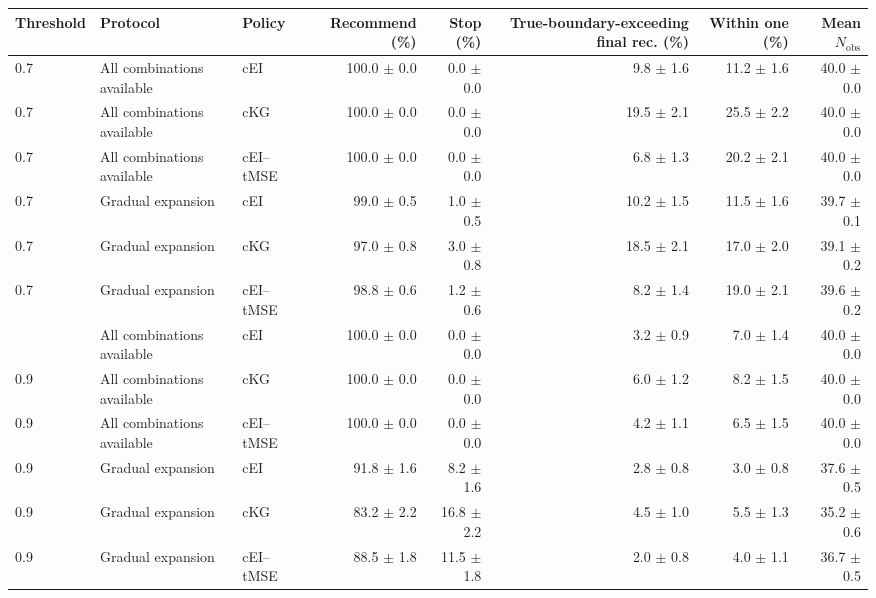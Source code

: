 \begin{tabular}{lllrrrrr}
\toprule
Threshold & Protocol & Policy & Recommend (\%) & Stop (\%) & True-boundary-exceeding final rec. (\%) & Within one (\%) & Mean $N_{\mathrm{obs}}$ \\
\midrule
0.7 & All combinations available & cEI & 100.0 $\pm$ 0.0 & 0.0 $\pm$ 0.0 & 9.8 $\pm$ 1.6 & 11.2 $\pm$ 1.6 & 40.0 $\pm$ 0.0 \\
0.7 & All combinations available & cKG & 100.0 $\pm$ 0.0 & 0.0 $\pm$ 0.0 & 19.5 $\pm$ 2.1 & 25.5 $\pm$ 2.2 & 40.0 $\pm$ 0.0 \\
0.7 & All combinations available & cEI--tMSE & 100.0 $\pm$ 0.0 & 0.0 $\pm$ 0.0 & 6.8 $\pm$ 1.3 & 20.2 $\pm$ 2.1 & 40.0 $\pm$ 0.0 \\
0.7 & Gradual expansion & cEI & 99.0 $\pm$ 0.5 & 1.0 $\pm$ 0.5 & 10.2 $\pm$ 1.5 & 11.5 $\pm$ 1.6 & 39.7 $\pm$ 0.1 \\
0.7 & Gradual expansion & cKG & 97.0 $\pm$ 0.8 & 3.0 $\pm$ 0.8 & 18.5 $\pm$ 2.1 & 17.0 $\pm$ 2.0 & 39.1 $\pm$ 0.2 \\
0.7 & Gradual expansion & cEI--tMSE & 98.8 $\pm$ 0.6 & 1.2 $\pm$ 0.6 & 8.2 $\pm$ 1.4 & 19.0 $\pm$ 2.1 & 39.6 $\pm$ 0.2 \\
\addlinespace
0.9 & All combinations available & cEI & 100.0 $\pm$ 0.0 & 0.0 $\pm$ 0.0 & 3.2 $\pm$ 0.9 & 7.0 $\pm$ 1.4 & 40.0 $\pm$ 0.0 \\
0.9 & All combinations available & cKG & 100.0 $\pm$ 0.0 & 0.0 $\pm$ 0.0 & 6.0 $\pm$ 1.2 & 8.2 $\pm$ 1.5 & 40.0 $\pm$ 0.0 \\
0.9 & All combinations available & cEI--tMSE & 100.0 $\pm$ 0.0 & 0.0 $\pm$ 0.0 & 4.2 $\pm$ 1.1 & 6.5 $\pm$ 1.5 & 40.0 $\pm$ 0.0 \\
0.9 & Gradual expansion & cEI & 91.8 $\pm$ 1.6 & 8.2 $\pm$ 1.6 & 2.8 $\pm$ 0.8 & 3.0 $\pm$ 0.8 & 37.6 $\pm$ 0.5 \\
0.9 & Gradual expansion & cKG & 83.2 $\pm$ 2.2 & 16.8 $\pm$ 2.2 & 4.5 $\pm$ 1.0 & 5.5 $\pm$ 1.3 & 35.2 $\pm$ 0.6 \\
0.9 & Gradual expansion & cEI--tMSE & 88.5 $\pm$ 1.8 & 11.5 $\pm$ 1.8 & 2.0 $\pm$ 0.8 & 4.0 $\pm$ 1.1 & 36.7 $\pm$ 0.5 \\
\bottomrule
\end{tabular}
